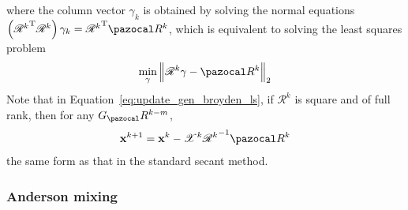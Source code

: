 where the column vector \(\gamma_{k}\) is obtained by solving the normal equations \(\left({\mathscr{R}^{k}}^{\mathrm{T}} \mathscr{R}^{k}\right) \gamma_{k}={\mathscr{R}^{k}}^{\mathrm{T}} \pazocal R^{k}\), which is equivalent to solving the least squares problem
\begin{equation}
  \min _{\gamma}\left\|\mathscr{R}^{k} \gamma-\pazocal R^{k}\right\|_{2}
\end{equation}
Note that in Equation~\eqref{eq:update_gen_broyden_ls}, if \(\mathscr{R}^{k}\) is square and of full rank, then for any \(G_\pazocal R^{k-m}\),
\begin{equation}
  \mathbf x^{k+1}=\mathbf x^{k}-\mathscr{X}^{k} {\mathscr{R}^{k}}^{-1} \pazocal R^{k}
\end{equation}
the same form as that in the standard secant method.

\subsubsection{Anderson mixing}

